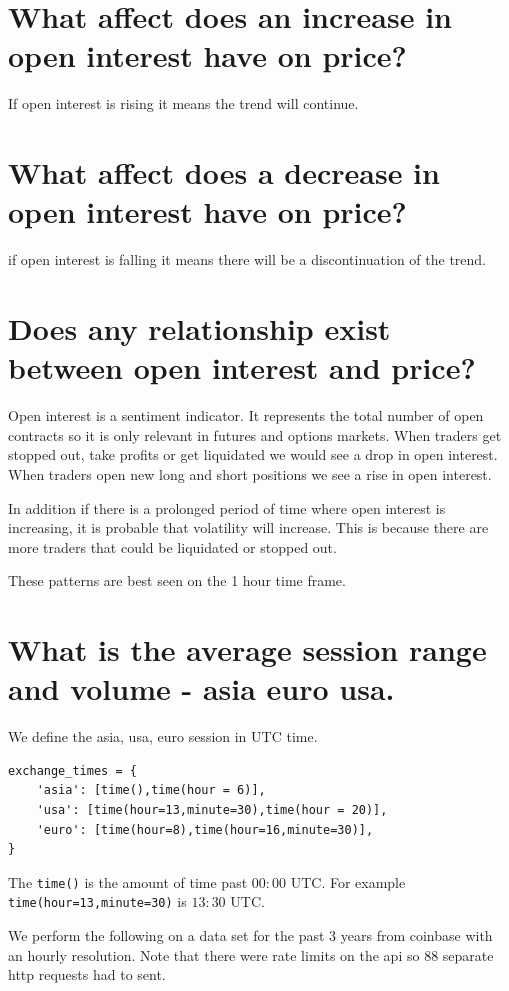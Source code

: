 \section{ What affect does an increase in open interest have on price?}
If open interest is rising it means the trend will continue.
\section{ What affect does a decrease in open interest have on price?}
if open interest is falling it means there will be a discontinuation of the trend.
\section{ Does any relationship exist between open interest and price?}
Open interest is a sentiment indicator.  It represents the total number of open contracts so it is only relevant in futures and options markets.  When traders get stopped out, take profits or get liquidated we would see a drop in open interest. When traders open new long and short positions we see a rise in open interest. 

In addition if there is a prolonged period of time where open interest is increasing, it is probable that volatility will increase.  This is because there are more traders that could be liquidated or stopped out. 

These patterns are best seen on the 1 hour time frame. 




\section{ What is the average session range and volume - asia euro usa.}


We define the asia, usa, euro session in UTC time.

\begin{verbatim}
exchange_times = {
    'asia': [time(),time(hour = 6)],
    'usa': [time(hour=13,minute=30),time(hour = 20)],
    'euro': [time(hour=8),time(hour=16,minute=30)],   
}
\end{verbatim}
The \texttt{time()} is the amount of time past $00:00$ UTC. For example \texttt{time(hour=13,minute=30)} is $13:30$ UTC.

We perform the following on a data set for the past 3 years from coinbase with an hourly resolution. Note that there were rate limits on the api so 88 separate http requests had to sent.

